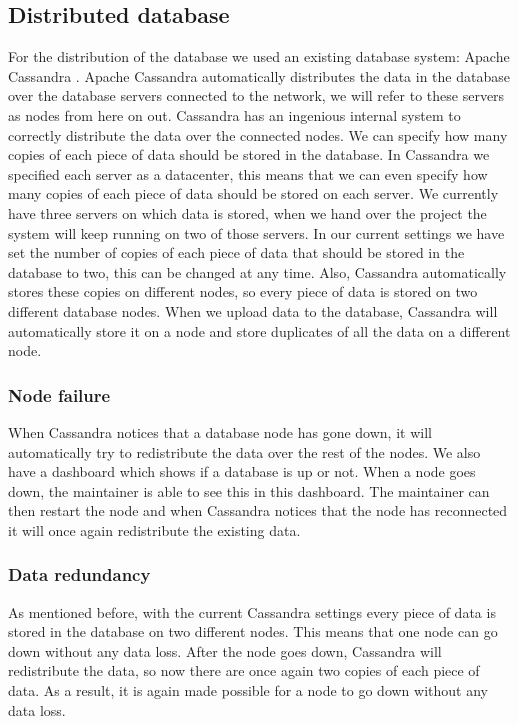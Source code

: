 \documentclass[../Main.tex]{subfiles}
\begin{document}
\subsection{Distributed database}
For the distribution of the database we used an existing database system: Apache Cassandra \cite{cassandra}. Apache Cassandra automatically distributes the data in the database over the database servers connected to the network, we will refer to these servers as nodes from here on out. Cassandra has an ingenious internal system to correctly distribute the data over the connected nodes. We can specify how many copies of each piece of data should be stored in the database. In Cassandra we specified each server as a datacenter, this means that we can even specify how many copies of each piece of data should be stored on each server. We currently have three servers on which data is stored, when we hand over the project the system will keep running on two of those servers. In our current settings we have set the number of copies of each piece of data that should be stored in the database to two, this can be changed at any time. Also, Cassandra automatically stores these copies on different nodes, so every piece of data is stored on two different database nodes. When we upload data to the database, Cassandra will automatically store it on a node and store duplicates of all the data on a different node. 

\subsubsection{Node failure}
When Cassandra notices that a database node has gone down, it will automatically try to redistribute the data over the rest of the nodes. We also have a dashboard which shows if a database is up or not. When a node goes down, the maintainer is able to see this in this dashboard. The maintainer can then restart the node and when Cassandra notices that the node has reconnected it will once again redistribute the existing data. 

\subsubsection{Data redundancy}
As mentioned before, with the current Cassandra settings every piece of data is stored in the database on two different nodes. This means that one node can go down without any data loss. After the node goes down, Cassandra will redistribute the data, so now there are once again two copies of each piece of data. As a result, it is again made possible for a node to go down without any data loss. \\
\end{document}
